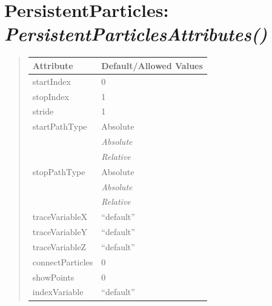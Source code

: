 \documentclass[letterpaper,10pt,english]{sphinxmanual}
\begin{document}
\begin{DUlineblock}{0em}
\item[] 
\end{DUlineblock}


\section{\textbf{PersistentParticles}: \emph{PersistentParticlesAttributes()}}
\label{attributes:persistentparticles-persistentparticlesattributes}
\begin{DUlineblock}{0em}
\item[] 
\end{DUlineblock}
\begin{quote}

\begin{tabulary}{\linewidth}{|L|L|}
\hline

\textbf{Attribute}
 & 
\textbf{Default/Allowed Values}
\\
\hline
startIndex
 & 
0
\\
\hline
stopIndex
 & 
1
\\
\hline
stride
 & 
1
\\
\hline
startPathType
 & 
Absolute
\\
\hline & 
\emph{Absolute}
\\
\hline & 
\emph{Relative}
\\
\hline
stopPathType
 & 
Absolute
\\
\hline & 
\emph{Absolute}
\\
\hline & 
\emph{Relative}
\\
\hline
traceVariableX
 & 
``default''
\\
\hline
traceVariableY
 & 
``default''
\\
\hline
traceVariableZ
 & 
``default''
\\
\hline
connectParticles
 & 
0
\\
\hline
showPoints
 & 
0
\\
\hline
indexVariable
 & 
``default''
\\
\hline\end{tabulary}

\end{quote}

\begin{DUlineblock}{0em}
\item[] 
\end{DUlineblock}

\begin{DUlineblock}{0em}
\item[] 
\end{DUlineblock}
\end{document}
